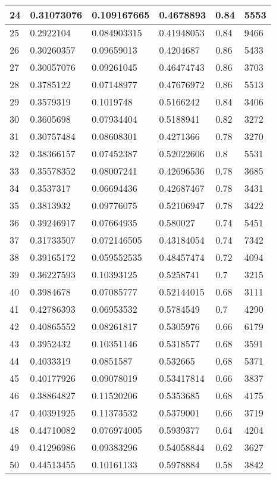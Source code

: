 \begin{longtable}{|l|l|l|l|l|l|}
24 & 0.31073076 & 0.109167665 & 0.4678893 & 0.84 & 5553 \\ \hline 
25 & 0.2922104 & 0.084903315 & 0.41948053 & 0.84 & 9466 \\ \hline 
26 & 0.30260357 & 0.09659013 & 0.4204687 & 0.86 & 5433 \\ \hline 
27 & 0.30057076 & 0.09261045 & 0.46474743 & 0.86 & 3703 \\ \hline 
28 & 0.3785122 & 0.07148977 & 0.47676972 & 0.86 & 5513 \\ \hline 
29 & 0.3579319 & 0.1019748 & 0.5166242 & 0.84 & 3406 \\ \hline 
30 & 0.3605698 & 0.07934404 & 0.5188941 & 0.82 & 3272 \\ \hline 
31 & 0.30757484 & 0.08608301 & 0.4271366 & 0.78 & 3270 \\ \hline 
32 & 0.38366157 & 0.07452387 & 0.52022606 & 0.8 & 5531 \\ \hline 
33 & 0.35578352 & 0.08007241 & 0.42696536 & 0.78 & 3685 \\ \hline 
34 & 0.3537317 & 0.06694436 & 0.42687467 & 0.78 & 3431 \\ \hline 
35 & 0.3813932 & 0.09776075 & 0.52106947 & 0.78 & 3422 \\ \hline 
36 & 0.39246917 & 0.07664935 & 0.580027 & 0.74 & 5451 \\ \hline 
37 & 0.31733507 & 0.072146505 & 0.43184054 & 0.74 & 7342 \\ \hline 
38 & 0.39165172 & 0.059552535 & 0.48457474 & 0.72 & 4094 \\ \hline 
39 & 0.36227593 & 0.10393125 & 0.5258741 & 0.7 & 3215 \\ \hline 
40 & 0.3984678 & 0.07085777 & 0.52144015 & 0.68 & 3111 \\ \hline 
41 & 0.42786393 & 0.06953532 & 0.5784549 & 0.7 & 4290 \\ \hline 
42 & 0.40865552 & 0.08261817 & 0.5305976 & 0.66 & 6179 \\ \hline 
43 & 0.3952432 & 0.10351146 & 0.5318577 & 0.68 & 3591 \\ \hline 
44 & 0.4033319 & 0.0851587 & 0.532665 & 0.68 & 5371 \\ \hline 
45 & 0.40177926 & 0.09078019 & 0.53417814 & 0.66 & 3837 \\ \hline 
46 & 0.38864827 & 0.11520206 & 0.5353685 & 0.68 & 4175 \\ \hline 
47 & 0.40391925 & 0.11373532 & 0.5379001 & 0.66 & 3719 \\ \hline 
48 & 0.44710082 & 0.076974005 & 0.5939377 & 0.64 & 4204 \\ \hline 
49 & 0.41296986 & 0.09383296 & 0.54058844 & 0.62 & 3627 \\ \hline 
50 & 0.44513455 & 0.10161133 & 0.5978884 & 0.58 & 3842 \\ \hline 
\end{longtable}